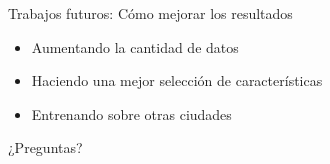 \documentclass[10pt]{beamer}
\begin{document}
\begin{frame}{Trabajos futuros: Cómo mejorar los resultados}
    \begin{itemize}[<+->]
    \item Aumentando la cantidad de datos
    \item Haciendo una mejor selección de características
    \item Entrenando sobre otras ciudades
    \end{itemize}
\end{frame}

\begin{frame}[standout]
  ¿Preguntas?
\end{frame}

\appendix
\end{document}

